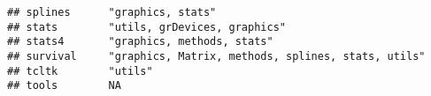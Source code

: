\documentclass[]{article}
\begin{document}
\begin{verbatim}
## splines      "graphics, stats"                                                                                                                                                                                                                                                                                                                                                                                                                                                                     
## stats        "utils, grDevices, graphics"                                                                                                                                                                                                                                                                                                                                                                                                                                                          
## stats4       "graphics, methods, stats"                                                                                                                                                                                                                                                                                                                                                                                                                                                            
## survival     "graphics, Matrix, methods, splines, stats, utils"                                                                                                                                                                                                                                                                                                                                                                                                                                    
## tcltk        "utils"                                                                                                                                                                                                                                                                                                                                                                                                                                                                               
## tools        NA                                                                                                                                                                                                                                                                                                                                                                                                                                                                                    

\end{verbatim}
\end{document}
